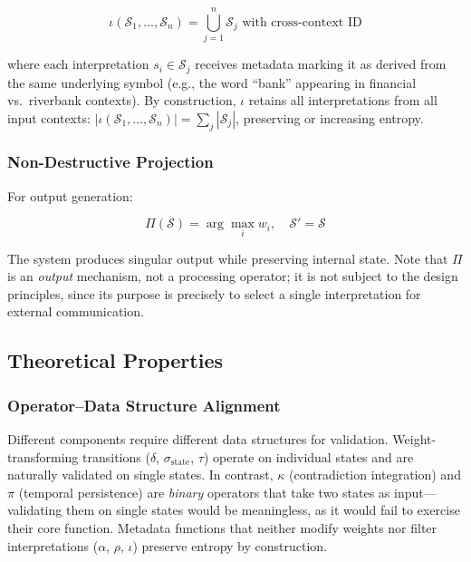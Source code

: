 \documentclass[11pt,a4paper]{article}
\begin{document}
\begin{equation}
\iota(\mathcal{S}_1, \ldots, \mathcal{S}_n) = \bigcup_{j=1}^{n} \mathcal{S}_j 
\text{ with cross-context ID}
\end{equation}

where each interpretation $s_i \in \mathcal{S}_j$ receives metadata 
marking it as derived from the same underlying symbol (e.g., the word 
``bank'' appearing in financial vs.\ riverbank contexts). By construction, 
$\iota$ retains all interpretations from all input contexts: 
$|\iota(\mathcal{S}_1, \ldots, \mathcal{S}_n)| = \sum_{j} |\mathcal{S}_j|$, 
preserving or increasing entropy.

\subsubsection{Non-Destructive Projection}

For output generation:

\begin{equation}
\Pi(\mathcal{S}) = \arg\max_i w_i, \quad \mathcal{S}' = \mathcal{S}
\end{equation}

The system produces singular output while preserving internal state.
Note that $\Pi$ is an \textit{output} mechanism, not a processing 
operator; it is not subject to the design principles, since its purpose 
is precisely to select a single interpretation for external communication.

\subsection{Theoretical Properties}
\label{app:properties}

\subsubsection{Operator--Data Structure Alignment}

Different components require different data structures for validation. 
Weight-transforming transitions ($\delta$, $\sigma_{\mathrm{state}}$, $\tau$) operate on 
individual states and are naturally validated on single states. In contrast, 
$\kappa$ (contradiction integration) and $\pi$ (temporal persistence) are 
\textit{binary} operators that take two states as input---validating 
them on single states would be meaningless, as it would fail to 
exercise their core function. Metadata functions that neither modify weights 
nor filter interpretations ($\alpha$, $\rho$, $\iota$) preserve 
entropy by construction.
\end{document}
